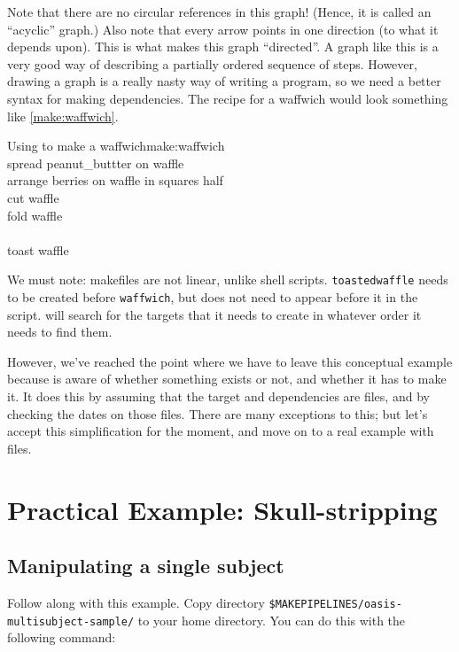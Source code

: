 Note that there are no circular references in this graph! (Hence, it is called an ``acyclic'' graph.) Also note that every arrow points in one direction (to what it depends upon). This is what makes this graph ``directed''. A graph like this is a very good way of describing a partially ordered sequence of steps.  However, drawing a graph is a really nasty way of writing a program, so we need a better syntax for making dependencies. The \maken{} recipe for a waffwich would look something like \autoref{make:waffwich}.

\begin{make}{Using \maken{} to make a waffwich}{make:waffwich}
	 \\
	\tab	spread peanut_buttter \dd on waffle \\
	\tab arrange berries \dd on waffle \dd in squares \dd half \\
	\tab cut waffle \\ 
	\tab fold waffle \\
	
	 \\
	\tab toast waffle
\end{make}

We must note: makefiles are not linear, unlike shell scripts. \texttt{toastedwaffle} needs to be created before \texttt{waffwich}, but does not need to appear before it in the script. \maken{} will search for the targets that it needs to create in whatever order it needs to find them.

However, we've reached the point where we have to leave this conceptual example because \maken{} is aware of whether something exists or not, and whether it has to make it. It does this by assuming that the target and dependencies are files, and by checking the dates on those files. There are many exceptions to this; but let's accept this simplification for the moment, and move on to a real example with files.

\section{Practical Example: Skull-stripping}

\subsection{Manipulating a single subject}

Follow along with this example. Copy directory 
\newline\texttt{\$MAKEPIPELINES/oasis-multisubject-sample/} 
to your home directory. You can do this with the following command:

